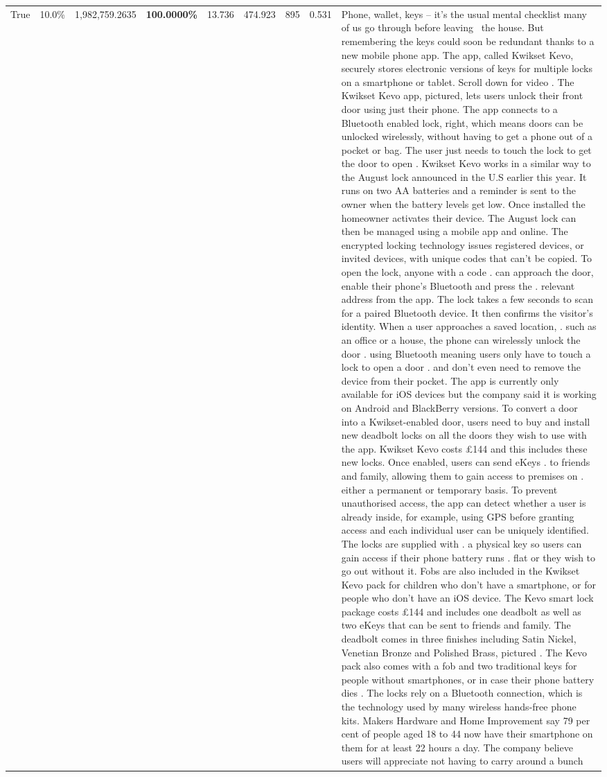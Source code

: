 \begin{table}[H]
\begin{tabular}{lllrlllll}
True & 10.0\% & 1,982,759.2635 & \bfseries \color{red} 100.0000\% & 13.736 & 474.923 & 895 & 0.531 & Phone, wallet, keys – it’s the usual mental checklist many of us go through before leaving  the house. But remembering the keys could soon be redundant thanks to a new mobile phone app. The app, called Kwikset Kevo, securely stores electronic versions of keys for multiple locks on a smartphone or tablet. Scroll down for video . The Kwikset Kevo app, pictured, lets users unlock their front door using just their phone. The app connects to a Bluetooth enabled lock, right, which means doors can be unlocked wirelessly, without having to get a phone out of a pocket or bag. The user just needs to touch the lock to get the door to open . Kwikset Kevo works in a similar way to the August lock announced in the U.S earlier this year. It runs on two AA batteries and a reminder is sent to the owner when the battery levels get low. Once installed the homeowner activates their device. The August lock can then be managed using a mobile app and online. The encrypted locking technology issues registered devices, or invited devices, with unique codes that can't be copied. To open the lock, anyone with a code . can approach the door, enable their phone's Bluetooth and press the . relevant address from the app. The lock takes a few seconds to scan for a paired Bluetooth device. It then confirms the visitor's identity. When a user approaches a saved location, . such as an office or a house, the phone can wirelessly unlock the door . using Bluetooth meaning users only have to touch a lock to open a door . and don't even need to remove the device from their pocket. The app is currently only available for iOS devices but the company said it is working on Android and BlackBerry versions. To convert a door into a Kwikset-enabled door, users need to buy and install new deadbolt locks on all the doors they wish to use with the app. Kwikset Kevo costs £144 and this includes these new locks. Once enabled, users can send eKeys . to friends and family, allowing them to gain access to premises on . either a permanent or temporary basis. To prevent unauthorised access, the app can detect whether a user is already inside, for example, using GPS before granting access and each individual user can be uniquely identified. The locks are supplied with . a physical key so users can gain access if their phone battery runs . flat or they wish to go out without it. Fobs are also included in the Kwikset Kevo pack for children who don't have a smartphone, or for people who don't have an iOS device. The Kevo smart lock package costs £144 and includes one deadbolt as well as two eKeys that can be sent to friends and family. The deadbolt comes in three finishes including Satin Nickel, Venetian Bronze and Polished Brass, pictured . The Kevo pack also comes with a fob and two traditional keys for people without smartphones, or in case their phone battery dies . The locks rely on a Bluetooth connection, which is the technology used by many wireless hands-free phone kits. Makers Hardware and Home Improvement say 79 per cent of people aged 18 to 44 now have their smartphone on them for at least 22 hours a day. The company believe users will appreciate not having to carry around a bunch 
\end{tabular}
\end{table}
